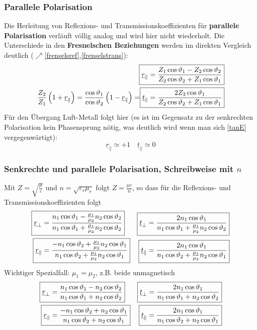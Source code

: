 	  \subsubsection{Parallele Polarisation}
			   Die Herleitung von Reflexions- und Transmissionskoeffizienten für \textbf{parallele Polarisation} verläuft völlig analog und wird hier nicht wiederholt. Die Unterschiede in den \textbf{Fresnelschen Beziehungen} werden im direkten Vergleich deutlich ($\nearrow$\ref{frenselsref},\ref{frenselstrans}):
			        \begin{align}
				        \Aboxed{\underline{r}_\parallel   & = \frac{Z_1\cos\vartheta_1-Z_2\cos\vartheta_2}{Z_2\cos\vartheta_2+Z_1\cos\vartheta_1}} \\
				        \frac{Z_2}{Z_1}\left(1+\underline{r}_\parallel\right)=\frac{\cos\vartheta_1}{\cos\vartheta_2}\left(1-\underline{r}_\parallel\right)
				        = \Aboxed{\underline{t}_\parallel & = \frac{2 Z_2\cos\vartheta_1}{Z_2\cos\vartheta_2+Z_1\cos\vartheta_1}}
			        \end{align}
		 Für den Übergang Luft-Metall folgt hier (es ist im Gegensatz zu der senkrechten Polarisation kein Phasensprung nötig, was deutlich wird wenn man sich \ref{tanE} vergegenwärtigt):
			        \begin{equation}
				        \underline{r}_\parallel \simeq +1 \quad \underline{t}_\parallel \simeq 0
			        \end{equation}
	  \subsubsection{Senkrechte und parallele Polarisation, Schreibweise mit $n$}
		  Mit \(Z=\sqrt{\frac{\mu}{\varepsilon}}\) und \(n=\sqrt{\varepsilon_r\mu_r}\) folgt \(Z = \frac{\mu c}{n}\), so dass für die Reflexions- und Transmissionskoeffizienten folgt
			        \begin{align}
				        \Aboxed{\underline{r}_\perp     & = \frac{n_1\cos\vartheta_1-\frac{\mu_1}{\mu_2} n_2\cos\vartheta_2}{n_1\cos\vartheta_1+\frac{\mu_1}{\mu_2} n_2\cos\vartheta_2}}  & \Aboxed{\underline{t}_\perp     & = \frac{2 n_1\cos\vartheta_1}{n_1\cos\vartheta_1+\frac{\mu_1}{\mu_2} n_2\cos\vartheta_2}} \\
				        \Aboxed{\underline{r}_\parallel & = \frac{-n_1\cos\vartheta_2+\frac{\mu_1}{\mu_2} n_2\cos\vartheta_1}{n_1\cos\vartheta_2+\frac{\mu_1}{\mu_2} n_2\cos\vartheta_1}} & \Aboxed{\underline{t}_\parallel & = \frac{2 n_1\cos\vartheta_1}{n_1\cos\vartheta_2+\frac{\mu_1}{\mu_2} n_2\cos\vartheta_1}}
			        \end{align}
			  Wichtiger Spezialfall: \textbf{\(\mu_1 = \mu_2\)}, z.B. beide unmagnetisch
			        \begin{align}
				        \Aboxed{\underline{r}_\perp     & = \frac{n_1\cos\vartheta_1- n_2\cos\vartheta_2}{n_1\cos\vartheta_1+ n_2\cos\vartheta_2}} & \Aboxed{\underline{t}_\perp     & = \frac{2 n_1\cos\vartheta_1}{n_1\cos\vartheta_1+ n_2\cos\vartheta_2}} \\
				        \Aboxed{\underline{r}_\parallel & = \frac{-n_1\cos\vartheta_2+n_2\cos\vartheta_1}{n_1\cos\vartheta_2+ n_2\cos\vartheta_1}} & \Aboxed{\underline{t}_\parallel & = \frac{2 n_1\cos\vartheta_1}{n_1\cos\vartheta_2+ n_2\cos\vartheta_1}}
			        \end{align}
